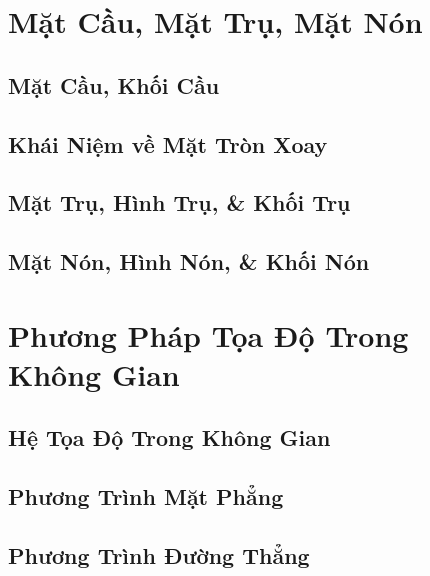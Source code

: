 \documentclass[oneside]{book}
\numberwithin{equation}{section}
\begin{document}

\chapter{Mặt Cầu, Mặt Trụ, Mặt Nón}

\section{Mặt Cầu, Khối Cầu}


\section{Khái Niệm về Mặt Tròn Xoay}


\section{Mặt Trụ, Hình Trụ, \& Khối Trụ}


\section{Mặt Nón, Hình Nón, \& Khối Nón}


\chapter{Phương Pháp Tọa Độ Trong Không Gian}

\section{Hệ Tọa Độ Trong Không Gian}


\section{Phương Trình Mặt Phẳng}


\section{Phương Trình Đường Thẳng}


\printbibliography[heading=bibintoc]
	
\end{document}
